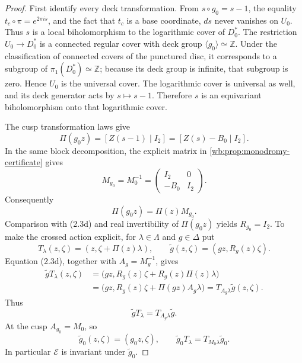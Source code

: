 \begin{proof}
First identify every deck transformation.  From
\(s\circ g_0=s-1\), the equality
\(t_c\circ\pi=e^{2\pi is}\), and the fact that \(t_c\) is a base
coordinate, \(ds\) never vanishes on \(U_0\).  Thus \(s\) is a local
biholomorphism to the logarithmic cover of \(D_0^*\).  The restriction
\(U_0\to D_0^*\) is a connected regular cover with deck group
\(\langle g_0\rangle\simeq\mathbb Z\).  Under the classification of connected
covers of the punctured disc, it corresponds to a subgroup of
\(\pi_1(D_0^*)\simeq\mathbb Z\); because its deck group is infinite, that
subgroup is zero.  Hence \(U_0\) is the universal cover.  The logarithmic
cover is universal as well, and its deck generator acts by
\(s\mapsto s-1\).  Therefore \(s\) is an equivariant biholomorphism onto that
logarithmic cover.

The cusp transformation laws give
\[
 \Pi(g_0z)=[Z(s-1)\mid I_2]=[Z(s)-B_0\mid I_2].
\]
In the same block decomposition, the explicit matrix in
\cref{wb:prop:monodromy-certificate} gives
\[
 M_{g_0}=M_0^{-1}
 =\begin{pmatrix}I_2&0\\-B_0&I_2\end{pmatrix}.
\]
Consequently
\[
 \Pi(g_0z)=\Pi(z)M_{g_0}.
\]
Comparison with (2.3d) and real invertibility of \(\Pi(g_0z)\) yields
\(R_{g_0}=I_2\).  To make the crossed action explicit, for
\(\lambda\in\Lambda\) and \(g\in\Delta\) put
\[
 T_\lambda(z,\zeta)=(z,\zeta+\Pi(z)\lambda),
 \qquad
 \widetilde g(z,\zeta)=(gz,R_g(z)\zeta).
\]
Equation (2.3d), together with \(A_g=M_g^{-1}\), gives
\[
\begin{aligned}
 \widetilde gT_\lambda(z,\zeta)
 &=\bigl(gz,R_g(z)\zeta+R_g(z)\Pi(z)\lambda\bigr)\\
 &=\bigl(gz,R_g(z)\zeta+\Pi(gz)A_g\lambda\bigr)
  =T_{A_g\lambda}\widetilde g(z,\zeta).
\end{aligned}
\]
Thus
\[
 \widetilde gT_\lambda=T_{A_g\lambda}\widetilde g.
\tag{2.8ii-a}
\]
At the cusp \(A_{g_0}=M_0\), so
\[
 \widetilde g_0(z,\zeta)=(g_0z,\zeta),
 \qquad
 \widetilde g_0T_\lambda=T_{M_0\lambda}\widetilde g_0.
\tag{2.8ii-b}
\]
In particular \(\mathcal E\) is invariant under \(\widetilde g_0\).


\end{proof}
